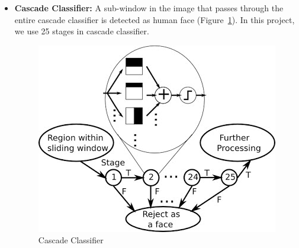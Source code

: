 \begin{itemize}
\vspace{0.1in}
\item \textbf{Cascade Classifier:} A sub-window in the image that passes through the entire cascade 
classifier is detected as human face (Figure~\ref{fig:cascade}). In this project, we use 25 stages in cascade classifier.

\begin{figure}[h]
  \centering
  \includegraphics[width=0.8\linewidth]{figs/cascade.jpg}
  \caption{Cascade Classifier \textnormal{\small }  }
  \label{fig:cascade}
\end{figure}

\end{itemize}
